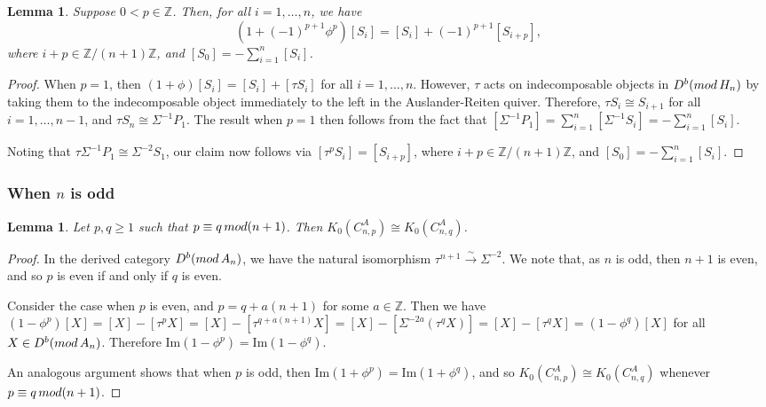 \documentclass[a4paper,reqno,11pt]{amsart}
\newtheorem{lemma}[theorem]{Lemma}
\theoremstyle{definition}
\renewcommand{\mod}{\mathop{\rm mod}\nolimits}%
\begin{document}
\begin{lemma}\label{Lem: Si in Im}
	Suppose $0 < p \in \mathbb{Z}$.
	Then, for all $i =1,\ldots,n$, we have
$$(1 + (-1)^{p+1} \phi^p)[S_i] = [S_i] + (-1)^{p+1} [S_{i+p}],$$
where $i+p \in \mathbb{Z}/(n+1)\mathbb{Z}$, and $[S_0] = - \sum_{i=1}^{n} [S_i]$.
\end{lemma}

\begin{proof}
	When $p=1$, then $(1 + \phi)[S_i] = [S_i] + [\tau S_i]$ for all $i =1,\ldots,n$.
	However, $\tau$ acts on indecomposable objects in $D^b(\mod H_n)$ by taking them to the indecomposable object immediately to the left in the Auslander-Reiten quiver.
	Therefore, $\tau S_i \cong S_{i+1}$ for all $i = 1,\ldots,n-1$, and $\tau S_n \cong \Sigma^{-1} P_1$.
	The result when $p=1$ then follows from the fact that $[\Sigma^{-1} P_1] = \sum_{i=1}^n [\Sigma^{-1} S_i] = - \sum_{i=1}^n [S_i]$.
	
	Noting that $\tau \Sigma^{-1} P_1 \cong \Sigma^{-2} S_1$, our claim now follows via $[\tau^p S_i] = [S_{i+p}]$, where $i+p \in \mathbb{Z}/(n+1)\mathbb{Z}$, and $[S_0] = - \sum_{i=1}^{n} [S_i]$.
\end{proof}

\subsubsection{When $n$ is odd}

\begin{lemma}\label{Lem: n odd, p,q equiv}
	Let $p,q \geq 1$ such that $p \equiv q \mod (n+1)$. Then $K_0(C_{n,p}^A) \cong K_0(C_{n,q}^A)$.
\end{lemma}

\begin{proof}
	In the derived category $D^b(\mod {A_n})$, we have the natural isomorphism $\tau^{n+1} \xrightarrow{\sim} \Sigma^{-2}$.
	We note that, as $n$ is odd, then $n+1$ is even, and so $p$ is even if and only if $q$ is even.
	
	Consider the case when $p$ is even, and $p = q +a(n+1)$ for some $a \in \mathbb{Z}$.
	Then we have $(1 - \phi^p)[X] = [X] - [\tau^p X] = [X] - [\tau^{q + a(n+1)}X] = [X] - [\Sigma^{-2a} (\tau^q X)] = [X] - [\tau^q X] = (1 - \phi^q)[X]$ for all $X \in D^b(\mod {A_n})$.
	Therefore $\mathrm{Im}(1 - \phi^p) = \mathrm{Im}(1 - \phi^q)$.
	
	An analogous argument shows that when $p$ is odd, then $\mathrm{Im}(1 + \phi^p) = \mathrm{Im}(1 + \phi^q)$, and so $K_0(C_{n,p}^A) \cong K_0(C_{n,q}^A)$ whenever $p \equiv q \mod (n+1)$.
\end{proof}
\end{document}
